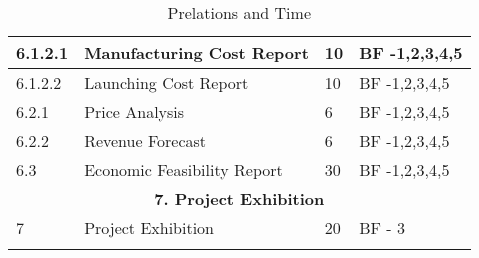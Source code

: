 \begin{longtable}{ | p{1.3cm} | p{7cm} | p{3cm} | p{3.5cm} |}
6.1.2.1 & Manufacturing Cost Report & 10 & BF -1,2,3,4,5  \\ \hline
6.1.2.2 & Launching Cost Report  & 10 & BF -1,2,3,4,5 \\ \hline
6.2.1 & Price Analysis & 6 & BF -1,2,3,4,5  \\ \hline
6.2.2 & Revenue Forecast & 6 & BF -1,2,3,4,5  \\ \hline
6.3 & Economic Feasibility Report & 30 & BF -1,2,3,4,5 \\ \hline
\multicolumn{4}{|c|}{\textbf{7. Project Exhibition}} \\ \hline
7 & Project Exhibition & 20 & BF - 3 \\ \hline
\caption{Prelations and Time} \\
\end{longtable}
